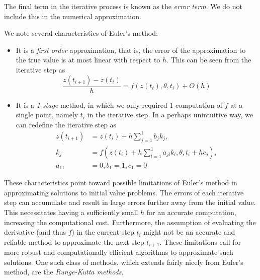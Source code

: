 \documentclass[a4paper,11pt,titlepage]{article}
\theoremstyle{definition}
\theoremstyle{plain}
\theoremstyle{remark}
\begin{document}
The final term in the iterative process is known as the \textit{error term}. We do not include this in the numerical approximation.

We note several characteristics of Euler's method:
\begin{itemize}
    \item It is a \textit{first order} approximation, that is, the error of the approximation to the true value is at most linear with respect to $h$. This can be seen from the iterative step as 
    $$
    \frac{z(t_{i+1}) - z(t_i)}{h} = f(z(t_i),\theta,t_i) + O(h)
    $$
    \item It is a \textit{1-stage} method, in which we only required 1 computation of $f$ at a single point, namely $t_i$ in the iterative step. In a perhaps unintuitive way, we can redefine the iterative step as 
    \begin{align*}
        z(t_{i+1}) &= z(t_i) + h\sum_{j=1}^1 b_j k_j, \\
        k_j &= f\left(z(t_i) + h\sum_{l=1}^1 a_{jl}k_l, \theta, t_i + hc_j\right), \\
        a_{11} &= 0, b_1 = 1, c_1 = 0
    \end{align*}
\end{itemize}

These characteristics point toward possible limitations of Euler's method in approximating solutions to initial value problems. The errors of each iterative step can accumulate and result in large errors further away from the initial value. This necessitates having a sufficiently small $h$ for an accurate computation, increasing the computational cost. Furthermore, the assumption of evaluating the derivative (and thus $f$) in the current step $t_i$ might not be an accurate and reliable method to approximate the next step $t_{i+1}$. These limitations call for more robust and computationally efficient algorithms to approximate such solutions. One such class of methods, which extends fairly nicely from Euler's method, are the \textit{Runge-Kutta methods}.
\end{document}
